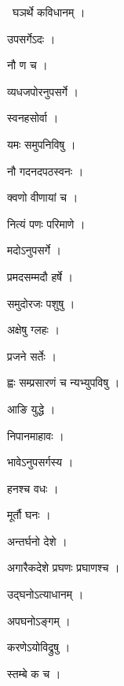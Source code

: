 \documentclass[10pt, openany, oneside]{book}
\begin{document}
\par\noindent\hspace{1.5em}{\vps वा॰}~{\qt घञर्थे कविधानम् ।}

\noindent उपसर्गेऽदः ।

\noindent नौ ण च ।

\noindent व्यधजपोरनुपसर्गे ।

\noindent स्वनहसोर्वा ।

\noindent यमः समुपनिविषु ।

\noindent नौ गदनदपठस्वनः ।

\noindent क्वणो वीणायां च ।

\noindent नित्यं पणः परिमाणे ।

\noindent मदोऽनुपसर्गे ।

\noindent प्रमदसम्मदौ हर्षे ।

\noindent समुदोरजः पशुषु ।

\noindent अक्षेषु ग्लहः ।

\noindent प्रजने सर्तेः ।

\noindent ह्वः सम्प्रसारणं च न्यभ्युपविषु ।

\noindent आङि युद्धे ।

\noindent निपानमाहावः ।

\noindent भावेऽनुपसर्गस्य ।

\noindent हनश्च वधः ।

\noindent मूर्तौ घनः ।

\noindent अन्तर्घनो देशे ।

\noindent अगारैकदेशे प्रघणः प्रघाणश्च ।

\noindent उद्घनोऽत्याधानम् ।

\noindent अपघनोऽङ्गम् ।

\noindent करणेऽयोविद्रुषु ।

\noindent स्तम्बे क च ।
\end{document}
